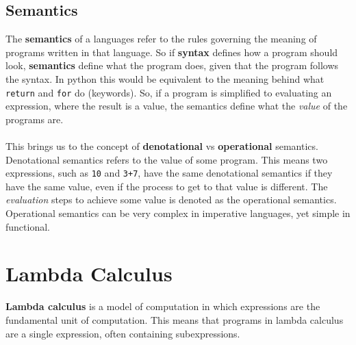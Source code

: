 \documentclass{report}
\begin{document}
    \subsection{Semantics}
    The \textbf{semantics} of a languages refer to the rules governing the meaning of programs written in that language. So if \textbf{syntax} defines how a program should look, \textbf{semantics} define what the program does, given that the program follows the syntax. In python this would be equivalent to the meaning behind what \texttt{return} and \texttt{for} do (keywords). So, if a program is simplified to evaluating an expression, where the result is a value, the semantics define what the \textit{value} of the programs are.\\\\
    This brings us to the concept of \textbf{denotational} vs \textbf{operational} semantics. Denotational semantics refers to the value of some program. This means two expressions, such as \texttt{10} and \texttt{3+7}, have the same denotational semantics if they have the same value, even if the process to get to that value is different. The \textit{evaluation} steps to achieve some value is denoted as the operational semantics. Operational semantics can be very complex in imperative languages, yet simple in functional.

    \section{Lambda Calculus}
    \textbf{Lambda calculus} is a model of computation in which expressions are the fundamental unit of computation. This means that programs in lambda calculus are a single expression, often containing subexpressions.



    
\end{document}

